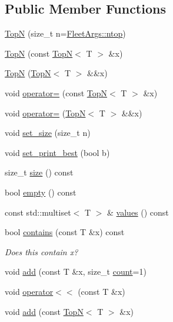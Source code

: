 \subsection*{Public Member Functions}
\begin{DoxyCompactItemize}
\item 
\hyperlink{class_top_n_aa8c18f3b2b9a26256a71dcc619052639}{TopN} (size\+\_\+t n=\hyperlink{namespace_fleet_args_acbc0f011abb2f878bf68a85617d8c183}{Fleet\+Args\+::ntop})
\item 
\hyperlink{class_top_n_a8bd54bb09006a68c350a173eddc55549}{TopN} (const \hyperlink{class_top_n}{TopN}$<$ T $>$ \&x)
\item 
\hyperlink{class_top_n_ab7bccf0028a9a4972cd8d5ae4a555553}{TopN} (\hyperlink{class_top_n}{TopN}$<$ T $>$ \&\&x)
\item 
void \hyperlink{class_top_n_ac6afd8e83833aedc8690c3a0622d5535}{operator=} (const \hyperlink{class_top_n}{TopN}$<$ T $>$ \&x)
\item 
void \hyperlink{class_top_n_ae8dfc906735d0aa9774d9e6c17cc9d1c}{operator=} (\hyperlink{class_top_n}{TopN}$<$ T $>$ \&\&x)
\item 
void \hyperlink{class_top_n_a37c7506de12038af705c55fc479dba7b}{set\+\_\+size} (size\+\_\+t n)
\item 
void \hyperlink{class_top_n_a378be54915dab8603b8408ee72310bb7}{set\+\_\+print\+\_\+best} (bool b)
\item 
size\+\_\+t \hyperlink{class_top_n_ae32d3e10d1571af34f84f32f5ca78fff}{size} () const
\item 
bool \hyperlink{class_top_n_adb29d7b6490afe04adb88caac2f7fba0}{empty} () const
\item 
const std\+::multiset$<$ T $>$ \& \hyperlink{class_top_n_a50b05f8d4580c4652e8c1f6770943adc}{values} () const
\item 
bool \hyperlink{class_top_n_a2e948bc78d03a92abd1623ae8f8bd3d4}{contains} (const T \&x) const
\begin{DoxyCompactList}\small\item\em Does this contain x? \end{DoxyCompactList}\item 
void \hyperlink{class_top_n_a4fdddece51570832503747bf85d5ec19}{add} (const T \&x, size\+\_\+t \hyperlink{class_top_n_a8bfb8d5daa31a4fd95196cb41f0ac1ce}{count}=1)
\item 
void \hyperlink{class_top_n_a719a9b488e33a8266a25c594a8eb579d}{operator$<$$<$} (const T \&x)
\item 
void \hyperlink{class_top_n_a09be6a8873eef07ea3993e9fe7b6c71d}{add} (const \hyperlink{class_top_n}{TopN}$<$ T $>$ \&x)

\end{DoxyCompactItemize}
